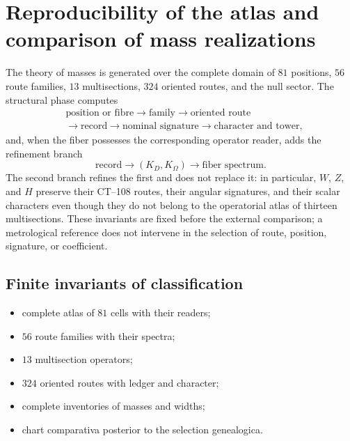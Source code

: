 \HMTDemoteHeadings


\HMTRestoreHeadings

\chapter{Reproducibility of the atlas and comparison of mass realizations}
\label{app:reproducibilidad-masas-acumulativa}
\label{app:suplemento-digital-masas-rev11}

The theory of masses is generated over the complete domain of
\(81\) positions, \(56\) route families, \(13\) multisections,
\(324\) oriented routes, and the null sector. The structural phase computes
\[
\begin{aligned}
&\text{position or fibre}\longrightarrow\text{family}
\longrightarrow\text{oriented route}\\
&\longrightarrow\text{record}
\longrightarrow\text{nominal signature}\longrightarrow\text{character and tower},
\end{aligned}
\]
and, when the fiber possesses the corresponding operator reader, adds the
refinement branch
\[
 \text{record}\longrightarrow(K_D,K_\Omega)
 \longrightarrow\text{fiber spectrum}.
\]
The second branch refines the first and does not replace it: in particular, \(W\), \(Z\), and \(H\) preserve their CT--108 routes, their angular signatures, and their scalar characters even though they do not belong to the operatorial atlas of thirteen multisections. These invariants are fixed before the external comparison; a metrological reference does not intervene in the selection of route, position, signature, or coefficient.

\section{Finite invariants of classification}
\label{sec:fuentes-certificado-tabla-masas-acumulativa}

\begin{itemize}
 \item complete atlas of $81$ cells with their readers;
 \item $56$ route families with their spectra;
 \item $13$ multisection operators;
 \item $324$ oriented routes with ledger and character;
 \item complete inventories of masses and widths;
 \item chart comparativa posterior to the selection genealogica.
\end{itemize}

